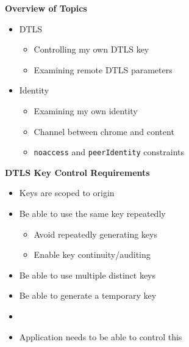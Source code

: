 \documentclass[helvetica]{seminar}
\newcommand{\heading}[1]{%
  \begin{center} 
    \large\bf 
    #1 
  \end{center} 
  \vspace{.4 in}}
\begin{document}
\begin{slide}
\begin{center}
\vspace{1 in}
\vspace{.2in}
\large{{Identity, Security, etc. API Issues}} \\
\vspace{3em}
\begin{tabular}{c}
Eric Rescorla \\
\url{ekr@rtfm.com}
\end{tabular}
}
\end{center}

\end{slide}


\centerslidesfalse 


\begin{slide}
\heading{Overview of Topics}

\begin{itemize}
\item DTLS
\begin{itemize}
  \item Controlling my own DTLS key
  \item Examining remote DTLS parameters
\end{itemize}

\item Identity
  \begin{itemize}
  \item Examining my own identity
  \item Channel between chrome and content
  \item \verb^noaccess^ and \verb^peerIdentity^ constraints
  \end{itemize}
\end{itemize}
\end{slide}


\begin{slide}
\heading{DTLS Key Control Requirements}

\begin{itemize}
\item Keys are scoped to origin
\item Be able to use the same key repeatedly
  \begin{itemize}
  \item Avoid repeatedly generating keys
  \item Enable key continuity/auditing
  \end{itemize}

\item Be able to use multiple distinct keys
\item Be able to generate a temporary key
\item[]
\item Application needs to be able to control this
\end{itemize}
\end{slide}
\end{document}
